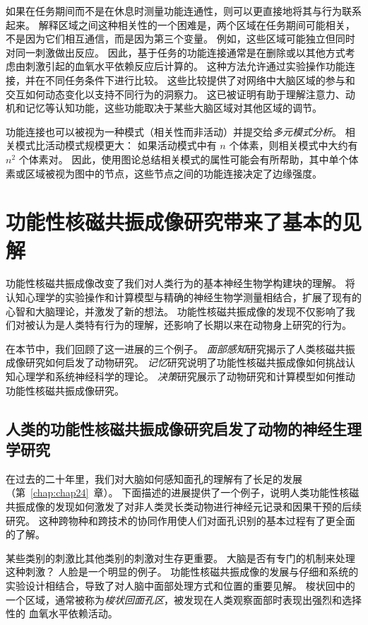 如果在任务期间而不是在休息时测量功能连通性，则可以更直接地将其与行为联系起来。 
解释区域之间这种相关性的一个困难是，两个区域在任务期间可能相关，不是因为它们相互通信，而是因为第三个变量。
例如，这些区域可能独立但同时对同一刺激做出反应。
因此，基于任务的功能连接通常是在删除或以其他方式考虑由刺激引起的血氧水平依赖反应后计算的。 
这种方法允许通过实验操作功能连接，并在不同任务条件下进行比较。
这些比较提供了对网络中大脑区域的参与和交互如何动态变化以支持不同行为的洞察力。
这已被证明有助于理解注意力、动机和记忆等认知功能，这些功能取决于某些大脑区域对其他区域的调节。


功能连接也可以被视为一种模式（相关性而非活动）并提交给\textit{多元模式分析}。 
相关模式比活动模式规模更大：
如果活动模式中有 $n$ 个体素，则相关模式中大约有 $n^2$ 个体素对。
因此，使用图论总结相关模式的属性可能会有所帮助，其中单个体素或区域被视为图中的节点，这些节点之间的功能连接决定了边缘强度。



\section{功能性核磁共振成像研究带来了基本的见解}

功能性核磁共振成像改变了我们对人类行为的基本神经生物学构建块的理解。
将认知心理学的实验操作和计算模型与精确的神经生物学测量相结合，扩展了现有的心智和大脑理论，并激发了新的想法。
功能性核磁共振成像的发现不仅影响了我们对被认为是人类特有行为的理解，还影响了长期以来在动物身上研究的行为。


在本节中，我们回顾了这一进展的三个例子。 
\textit{面部感知}研究揭示了人类核磁共振成像研究如何启发了动物研究。
\textit{记忆}研究说明了功能性核磁共振成像如何挑战认知心理学和系统神经科学的理论。
\textit{决策}研究展示了动物研究和计算模型如何推动功能性核磁共振成像研究。


\subsection{人类的功能性核磁共振成像研究启发了动物的神经生理学研究}

在过去的二十年里，我们对大脑如何感知面孔的理解有了长足的发展（第~\ref{chap:chap24}~章）。 
下面描述的进展提供了一个例子，说明人类功能性核磁共振成像的发现如何激发了对非人类灵长类动物进行神经元记录和因果干预的后续研究。
这种跨物种和跨技术的协同作用使人们对面孔识别的基本过程有了更全面的了解。


某些类别的刺激比其他类别的刺激对生存更重要。 
大脑是否有专门的机制来处理这种刺激？ 
人脸是一个明显的例子。 
功能性核磁共振成像的发展与仔细和系统的实验设计相结合，导致了对人脑中面部处理方式和位置的重要见解。 
梭状回中的一个区域，通常被称为\textit{梭状回面孔区}，被发现在人类观察面部时表现出强烈和选择性的 血氧水平依赖活动。


